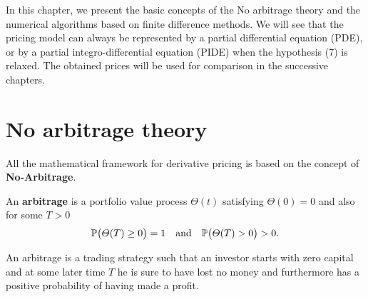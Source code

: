 In this chapter, we present the basic concepts of the No arbitrage theory and the numerical algorithms based on finite difference methods. 
We will see that the pricing model can always be represented by a partial differential equation (PDE), or by a partial integro-differential equation 
(PIDE) when the hypothesis (7) is relaxed. 
The obtained prices will be used for comparison in the successive chapters.


\section{No arbitrage theory}

All the mathematical framework for derivative pricing is based on the concept of \textbf{No-Arbitrage}.
\begin{Definition}\label{arbitrage_def}
 An \textbf{arbitrage} is a portfolio value process $\varTheta(t)$ satisfying $\varTheta(0)=0$ and also for some $T>0$
 $$ \mathbb{P}\bigl( \varTheta(T) \geq 0 \bigr) = 1 \quad \mbox{and} \quad \mathbb{P}\bigl( \varTheta(T) > 0 \bigr) > 0. $$
\end{Definition}
An arbitrage is a trading strategy such that an investor starts with zero capital and at some later time $T$ he is sure to have lost no money and furthermore has a positive
probability of having made a profit.

